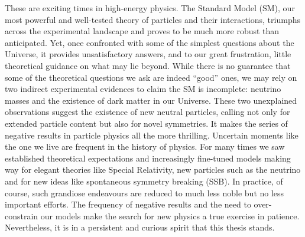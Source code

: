 \documentclass[openany,twoside,frontopenright,chaprunninghead]{ip3thesis}
\begin{document}
These are exciting times in high-energy physics. The Standard Model (SM), our most powerful and well-tested theory of particles and their interactions, triumphs across the experimental landscape and proves to be much more robust than anticipated. Yet, once confronted with some of the simplest questions about the Universe, it provides unsatisfactory answers, and to our great frustration, little theoretical guidance on what may lie beyond. While there is no guarantee that some of the theoretical questions we ask are indeed ``good'' ones, we may rely on two indirect experimental evidences to claim the SM is incomplete: neutrino masses and the existence of dark matter in our Universe. These two unexplained observations suggest the existence of new neutral particles, calling not only for extended particle content but also for novel symmetries. It makes the series of negative results in particle physics all the more thrilling. Uncertain moments like the one we live are frequent in the history of physics. For many times we saw established theoretical expectations and increasingly fine-tuned models making way for elegant theories like Special Relativity, new particles such as the neutrino and for new ideas like spontaneous symmetry breaking (SSB). In practice, of course, such grandiose endeavours are reduced to much less noble but no less important efforts. The frequency of negative results and the need to over-constrain our models make the search for new physics a true exercise in patience. Nevertheless, it is in a persistent and curious spirit that this thesis stands.
\end{document}
